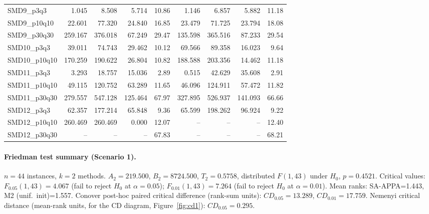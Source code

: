 \begin{longtable}{lrrrrrrrr}
SMD9\_p3q3 & 1.045 & 8.508 & 5.714 & 10.86 & 1.146 & 6.857 & 5.882 & 11.18 \\
SMD9\_p10q10 & 22.601 & 77.320 & 24.840 & 16.85 & 23.479 & 71.725 & 23.794 & 18.08 \\
SMD9\_p30q30 & 259.167 & 376.018 & 67.249 & 29.47 & 135.598 & 365.516 & 87.233 & 29.54 \\
SMD10\_p3q3 & 39.011 & 74.743 & 29.462 & 10.12 & 69.566 & 89.358 & 16.023 & 9.64 \\
SMD10\_p10q10 & 170.259 & 190.622 & 26.804 & 10.82 & 188.588 & 203.356 & 14.462 & 11.18 \\
SMD11\_p3q3 & 3.293 & 18.757 & 15.036 & 2.89 & 0.515 & 42.629 & 35.608 & 2.91 \\
SMD11\_p10q10 & 49.115 & 120.752 & 63.289 & 11.65 & 46.096 & 124.911 & 57.472 & 11.82 \\
SMD11\_p30q30 & 279.557 & 547.128 & 125.464 & 67.97 & 327.895 & 526.937 & 141.093 & 66.66 \\
SMD12\_p3q3 & 62.357 & 177.214 & 65.848 & 9.36 & 65.599 & 198.262 & 96.924 & 9.22 \\
SMD12\_p10q10 & 260.469 & 260.469 & 0.000 & 12.07 & -- & -- & -- & 12.40 \\
SMD12\_p30q30 & -- & -- & -- & 67.83 & -- & -- & -- & 68.21 \\
\end{longtable}
\endgroup

\paragraph{Friedman test summary (Scenario 1).}
$n=44$ instances, $k=2$ methods. $A_2=219.500$, $B_2=8724.500$, $T_2=0.5758$, distributed $F(1,43)$ under $H_0$, $p=0.4521$. Critical values: $F_{0.05}(1,43)=4.067$ (fail to reject $H_0$ at $\alpha=0.05$); $F_{0.01}(1,43)=7.264$ (fail to reject $H_0$ at $\alpha=0.01$). Mean ranks: SA-APPA=1.443, M2 (unif.\ init)=1.557. Conover post-hoc paired critical difference (rank-sum units): $CD_{0.05}=13.289$, $CD_{0.01}=17.759$. Nemenyi critical distance (mean-rank units, for the CD diagram, Figure~\ref{fig:cd1}): $CD_{0.05}=0.295$.
